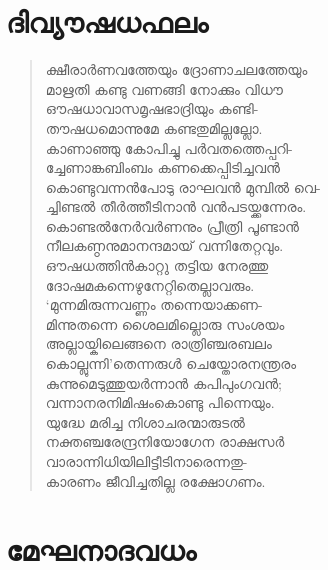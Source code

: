 
\section{ദിവ്യൗഷധഫലം}

\begin{verse}
ക്ഷീരാര്‍ണവത്തേയും ദ്രോണാചലത്തേയും\\
മാഋതി കണ്ടു വണങ്ങി നോക്കും വിധൗ\\
ഔഷധാവാസമൃഷഭാദ്രിയും കണ്ടി-\\
തൗഷധമൊന്നുമേ കണ്ടതുമില്ലല്ലോ.\\
കാണാഞ്ഞു കോപിച്ചു പര്‍വതത്തെപ്പറി-\\
ച്ചേണാങ്കബിംബം കണക്കെപ്പിടിച്ചവന്‍\\
കൊണ്ടുവന്നന്‍പോടു രാഘവന്‍ മുമ്പില്‍ വെ-\\
ച്ചിണ്ടല്‍ തീര്‍ത്തീടിനാന്‍ വന്‍പടയ്ക്കന്നേരം.\\
കൊണ്ടല്‍നേര്‍വര്‍ണനും പ്രീത്രി പൂണ്ടാന്‍\\
നീലകണ്ഠനുമാനന്ദമായ് വന്നിതേറ്റവും.\\
ഔഷധത്തിന്‍കാറ്റു തട്ടിയ നേരത്തു\\
ദോഷമകന്നെഴുനേറ്റിതെല്ലാവരും.\\
‘മുന്നമിരുന്നവണ്ണം തന്നെയാക്കണ-\\
മിന്നുതന്നെ ശൈലമില്ലൊരു സംശയം\\
അല്ലായ്കിലെങ്ങനെ രാത്രിഞ്ചരബലം\\
കൊല്ലുന്നി’തെന്നരുള്‍ ചെയ്തോരനന്ത്രരം\\
കുന്നുമെടുത്തുയര്‍ന്നാന്‍ കപിപുംഗവന്‍;\\
വന്നാനരനിമിഷംകൊണ്ടു പിന്നെയും.\\
യുദ്ധേ മരിച്ച നിശാചരന്മാരുടല്‍\\
നക്തഞ്ചരേന്ദ്രനിയോഗേന രാക്ഷസര്‍\\
വാരാന്നിധിയിലിട്ടീടിനാരെന്നതു-\\
കാരണം ജീവിച്ചതില്ല രക്ഷോഗണം.
\end{verse}


\section{മേഘനാദവധം}

